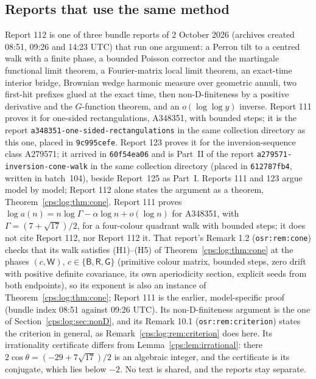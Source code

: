 \documentclass[11pt,letterpaper]{article}
\numberwithin{equation}{section}
\theoremstyle{remark}\newtheorem{remark}[theorem]{Remark}
\newcommand{\repo}[1]{\nolinkurl{#1}}
\begin{document}
\subsection{Reports that use the same method}\label{cps:log:sec:siblings}
Report 112 is one of three bundle reports of 2 October 2026 (archives created 08:51, 09:26
and 14:23 UTC) that run one argument: a Perron tilt to a centred walk with a finite phase, a
bounded Poisson corrector and the martingale functional limit theorem, a Fourier-matrix local
limit theorem, an exact-time interior bridge, Brownian wedge harmonic measure over geometric
annuli, two first-hit prefixes glued at the exact time, then non-D-finiteness by a positive
derivative and the $G$-function theorem, and an $o(\log\log y)$ inverse. Report 111 proves it for
one-sided rectangulations, A348351, with bounded steps; it is the report \repo{a348351-one-sided-rectangulations} in the same collection directory as this one,
placed in \texttt{9c995cefe}. Report 123 proves it for the inversion-sequence class A279571; it
arrived in \texttt{60f54ea06} and is Part~II of the report \repo{a279571-inversion-cone-walk} in the
same collection directory (placed in \texttt{612787fb4}, written in batch~104), beside Report~125 as
Part~I. Reports 111 and 123 argue
model by model; Report 112 alone states the argument as a theorem,
Theorem~\ref{cps:log:thm:cone}. Report 111 proves
$\log a(n)=n\log\Gamma-\alpha\log n+o(\log n)$ for A348351, with $\Gamma=(7+\sqrt{17})/2$, for a
four-colour quadrant walk with bounded steps; it does not cite Report 112, nor Report 112 it.
That report's Remark 1.2 (\texttt{osr:rem:cone}) checks that its walk satisfies (H1)--(H5) of
Theorem~\ref{cps:log:thm:cone} at the phases $(c,\mathsf W)$, $c\in\{\mathsf B,\mathsf R,\mathsf G\}$
(primitive colour matrix, bounded steps, zero drift with positive definite covariance, its own
aperiodicity section, explicit seeds from both endpoints), so its exponent is also an instance of
Theorem~\ref{cps:log:thm:cone}; Report 111 is the earlier, model-specific proof (bundle index
08:51 against 09:26 UTC). Its non-D-finiteness argument is the one of
Section~\ref{cps:log:sec:nonD}, and its Remark 10.1 (\texttt{osr:rem:criterion}) states the
criterion in general, as Remark~\ref{cps:log:rem:criterion} does here. Its irrationality
certificate differs from Lemma~\ref{cps:lem:irrational}: there $2\cos\theta=(-29+7\sqrt{17})/2$
is an algebraic integer, and the certificate is its conjugate, which lies below $-2$. No text is
shared, and the reports stay separate.
\end{document}
